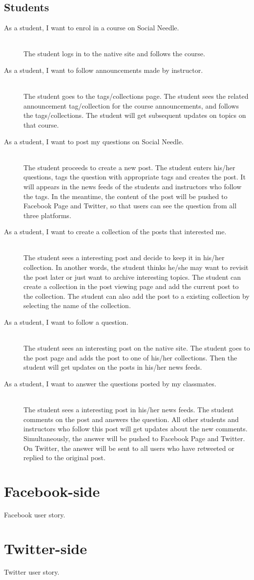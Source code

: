 \subsection{Students}
\begin{description}
	\item[As a student, I want to enrol in a course on Social Needle.] \hfill \\
	The student logs in to the native site and follows the course. 
	\item[As a student, I want to follow announcements made by instructor.] \hfill \\
	The student goes to the tags/collections page. The student sees the related announcement tag/collection for the course announcements, and follows the tags/collections. The student will get subsequent updates on topics on that course. 
	\item[As a student, I want to post my questions on Social Needle.] \hfill \\
	The student proceeds to create a new post. The student enters his/her questions, tags the question with appropriate tags and creates the post. It will appears in the news feeds of the students and instructors who follow the tags. In the meantime, the content of the post will be pushed to Facebook Page and Twitter, so that users can see the question from all three platforms.
	\item[As a student, I want to create a collection of the posts that interested me.] \hfill \\
	The student sees a interesting post and decide to keep it in his/her collection. In another words, the student thinks he/she may want to revisit the post later or just want to archive interesting topics. The student can create a collection in the post viewing page and add the current post to the collection. The student can also add the post to a existing collection by selecting the name of the collection. 
	\item[As a student, I want to follow a question.] \hfill \\
	The student sees an interesting post on the native site. The student goes to the post page and adds the post to one of his/her collections. Then the student will get updates on the posts in his/her news feeds.
	\item[As a student, I want to answer the questions posted by my classmates.] \hfill \\
	The student sees a interesting post in his/her news feeds. The student comments on the post and answers the question. All other students and instructors who follow this post will get updates about the new comments. Simultaneously, the answer will be pushed to Facebook Page and Twitter. On Twitter, the answer will be sent to all users who have retweeted or replied to the original post. 

\end{description}

\section{Facebook-side}
Facebook user story.
\section{Twitter-side}
Twitter user story.